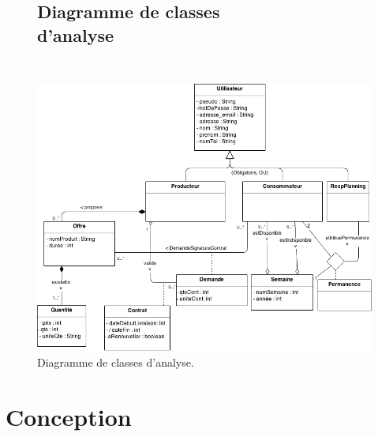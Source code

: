 \documentclass[12pt]{report}
\begin{document}
\begin{figure}[!h]
\centering
\subsection{Diagramme de classes d'analyse~~~~~~~~~~~~~~~~~~~~~~~~~~~~~~~}
\includegraphics[height=.9\textwidth]{./ressources/class_analyse.png}
\caption{Diagramme de classes d'analyse.}
\end{figure}
\clearpage


\section{Conception}
\end{document}
